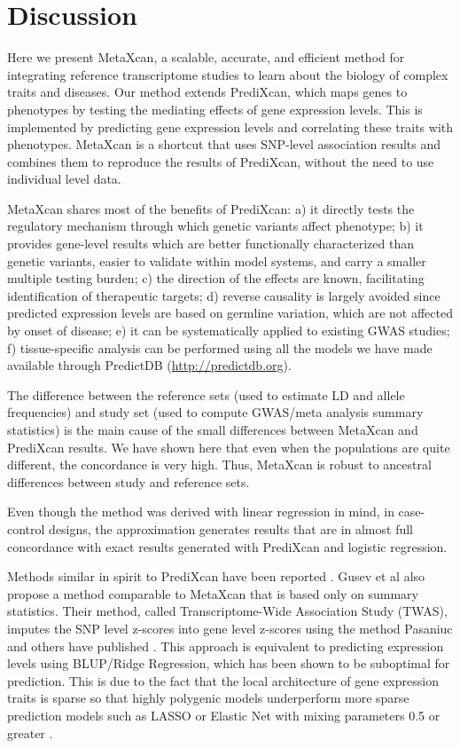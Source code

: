 \documentclass[10pt]{article}
\begin{document}
\section*{Discussion}

Here we present MetaXcan, a scalable, accurate, and efficient method for integrating reference transcriptome studies to learn about the biology of complex traits and diseases. Our method extends PrediXcan, which maps genes to phenotypes by testing the mediating effects of gene expression levels. This is implemented by predicting gene expression levels  and correlating these traits with phenotypes. MetaXcan is a shortcut that uses SNP-level association results and combines them to reproduce the results of PrediXcan, without the need to use individual level data.

MetaXcan shares most of the benefits of PrediXcan: a) it directly tests the regulatory mechanism through which genetic variants affect phenotype; b) it provides gene-level results which are better functionally characterized than genetic variants, easier to validate within model systems, and carry a smaller multiple testing burden; c) the direction of the effects are known, facilitating identification of therapeutic targets; d) reverse causality is largely avoided since predicted expression levels are based on germline variation, which are not affected by onset of disease; e) it can be systematically applied to existing GWAS studies; f) tissue-specific analysis can be performed using all the models we have made available through PredictDB (\url{http://predictdb.org}).
%
%
%

The difference between the reference sets (used to estimate LD and allele frequencies) and study set (used to compute GWAS/meta analysis summary statistics) is the main cause of the small differences between MetaXcan and PrediXcan results. We have shown here that even when the populations are quite different, the concordance is very high. Thus, MetaXcan is robust to ancestral differences between study and reference sets.

Even though the method was derived with linear regression in mind, in case-control designs, the approximation generates results that are in almost full  concordance with exact results generated with PrediXcan and logistic regression.

Methods similar in spirit to PrediXcan have been reported \cite{Gusev2016}. Gusev et al also propose a method comparable to MetaXcan that is based only on summary statistics. Their method, called Transcriptome-Wide Association Study (TWAS), imputes the SNP level z-scores into gene level z-scores using the method Pasaniuc and others have published \cite{Pasaniuc2014}. This approach is equivalent to predicting expression levels using BLUP/Ridge Regression, which has been shown to be suboptimal for prediction. This is due to the fact that the local architecture of gene expression traits is sparse so that highly polygenic models underperform more sparse prediction models such as LASSO or Elastic Net with mixing parameters 0.5 or greater \cite{Wheeler2016}.
\end{document}
